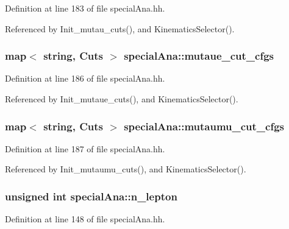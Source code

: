 Definition at line 183 of file special\-Ana.\-hh.



Referenced by Init\-\_\-mutau\-\_\-cuts(), and Kinematics\-Selector().

\subsubsection[{mutaue\-\_\-cut\-\_\-cfgs}]{\setlength{\rightskip}{0pt plus 5cm}map$<$ string, {\bf Cuts} $>$ special\-Ana\-::mutaue\-\_\-cut\-\_\-cfgs}\label{classspecialAna_ae140f6e63d9061ce6b8310f093e163c6}


Definition at line 186 of file special\-Ana.\-hh.



Referenced by Init\-\_\-mutaue\-\_\-cuts(), and Kinematics\-Selector().

\subsubsection[{mutaumu\-\_\-cut\-\_\-cfgs}]{\setlength{\rightskip}{0pt plus 5cm}map$<$ string, {\bf Cuts} $>$ special\-Ana\-::mutaumu\-\_\-cut\-\_\-cfgs}\label{classspecialAna_af9e77720216d2b89101572b8b620ab72}


Definition at line 187 of file special\-Ana.\-hh.



Referenced by Init\-\_\-mutaumu\-\_\-cuts(), and Kinematics\-Selector().

\subsubsection[{n\-\_\-lepton}]{\setlength{\rightskip}{0pt plus 5cm}unsigned int special\-Ana\-::n\-\_\-lepton}\label{classspecialAna_af80eb340f7aed6a1d0caa49d2b30a884}


Definition at line 148 of file special\-Ana.\-hh.

